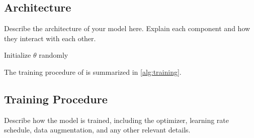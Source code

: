 \subsection{Architecture}
\label{sec:architecture}

Describe the architecture of your model here. Explain each component and how they interact with each other.

\begin{algorithm}[t]
  \caption{Training Procedure of \method}
  \label{alg:training}
  Initialize $\theta$ randomly\;
  \Return{$\theta$}
\end{algorithm}

The training procedure of \method is summarized in \cref{alg:training}.

\subsection{Training Procedure}
\label{sec:training}

Describe how the model is trained, including the optimizer, learning rate schedule, data augmentation, and any other relevant details.
